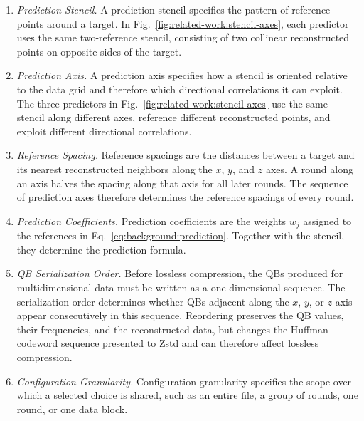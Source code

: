 \begin{enumerate}
\item \emph{Prediction Stencil.} A prediction stencil specifies the pattern of reference points around a target. In Fig.~\ref{fig:related-work:stencil-axes}, each predictor uses the same two-reference stencil, consisting of two collinear reconstructed points on opposite sides of the target.

\item \emph{Prediction Axis.} A prediction axis specifies how a stencil is oriented relative to the data grid and therefore which directional correlations it can exploit. The three predictors in Fig.~\ref{fig:related-work:stencil-axes} use the same stencil along different axes, reference different reconstructed points, and exploit different directional correlations.

\item \emph{Reference Spacing.} Reference spacings are the distances between a target and its nearest reconstructed neighbors along the $x$, $y$, and $z$ axes. A round along an axis halves the spacing along that axis for all later rounds. The sequence of prediction axes therefore determines the reference spacings of every round.

\item \emph{Prediction Coefficients.} Prediction coefficients are the weights $w_j$ assigned to the references in Eq.~\eqref{eq:background:prediction}. Together with the stencil, they determine the prediction formula.

\item \emph{QB Serialization Order.} Before lossless compression, the QBs produced for multidimensional data must be written as a one-dimensional sequence. The serialization order determines whether QBs adjacent along the $x$, $y$, or $z$ axis appear consecutively in this sequence. Reordering preserves the QB values, their frequencies, and the reconstructed data, but changes the Huffman-codeword sequence presented to Zstd and can therefore affect lossless compression.

\item \emph{Configuration Granularity.} Configuration granularity specifies the scope over which a selected choice is shared, such as an entire file, a group of rounds, one round, or one data block.
\end{enumerate}
